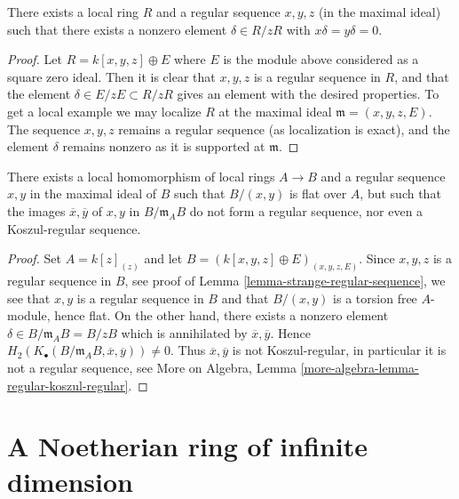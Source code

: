 \begin{lemma}
\label{lemma-strange-regular-sequence}
There exists a local ring $R$ and a regular sequence $x, y, z$
(in the maximal ideal) such that there exists a nonzero element
$\delta \in R/zR$ with $x\delta = y\delta = 0$.
\end{lemma}

\begin{proof}
Let $R = k[x, y, z] \oplus E$ where $E$ is the module above considered
as a square zero ideal. Then it is clear that $x, y, z$ is a regular
sequence in $R$, and that the element $\delta \in E/zE \subset R/zR$
gives an element with the desired properties. To get a local example
we may localize $R$ at the maximal ideal $\mathfrak m = (x, y, z, E)$.
The sequence $x, y, z$ remains a regular sequence (as localization is
exact), and the element $\delta$ remains nonzero as it is supported
at $\mathfrak m$.
\end{proof}

\begin{lemma}
\label{lemma-base-change-regular-sequence}
There exists a local homomorphism of local rings $A \to B$
and a regular sequence $x, y$ in the maximal ideal of $B$ such that
$B/(x, y)$ is flat over $A$, but such that the images
$\overline{x}, \overline{y}$ of $x, y$ in $B/\mathfrak m_AB$ do not
form a regular sequence, nor even a Koszul-regular sequence.
\end{lemma}

\begin{proof}
Set $A = k[z]_{(z)}$ and let $B = (k[x, y, z] \oplus E)_{(x, y, z, E)}$.
Since $x, y, z$ is a regular sequence in $B$, see proof of
Lemma \ref{lemma-strange-regular-sequence},
we see that $x, y$ is a regular sequence in $B$ and that
$B/(x, y)$ is a torsion free $A$-module, hence flat.
On the other hand, there exists a nonzero element
$\delta \in B/\mathfrak m_AB = B/zB$ which is annihilated
by $\overline{x}, \overline{y}$. Hence
$H_2(K_\bullet(B/\mathfrak m_AB, \overline{x}, \overline{y})) \not = 0$.
Thus $\overline{x}, \overline{y}$ is not Koszul-regular, in particular
it is not a regular sequence, see
More on Algebra, Lemma \ref{more-algebra-lemma-regular-koszul-regular}.
\end{proof}





\section{A Noetherian ring of infinite dimension}
\label{section-Noetherian-infinite-dimension}


